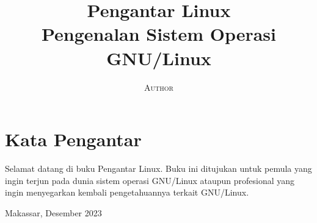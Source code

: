 \documentclass{book}
\title{\Huge \textbf{Pengantar Linux} \\ \huge Pengenalan Sistem Operasi GNU/Linux}
\author{\textsc{Author}}
\begin{document}

\frontmatter

\maketitle

\chapter*{Kata Pengantar}

Selamat datang di buku Pengantar Linux. Buku ini ditujukan untuk pemula yang ingin terjun pada dunia sistem operasi GNU/Linux ataupun profesional yang ingin menyegarkan kembali pengetahuannya terkait GNU/Linux. \\

\begin{flushright}\noindent
	Makassar, Desember 2023
\end{flushright}

\tableofcontents



\mainmatter










\end{document}
